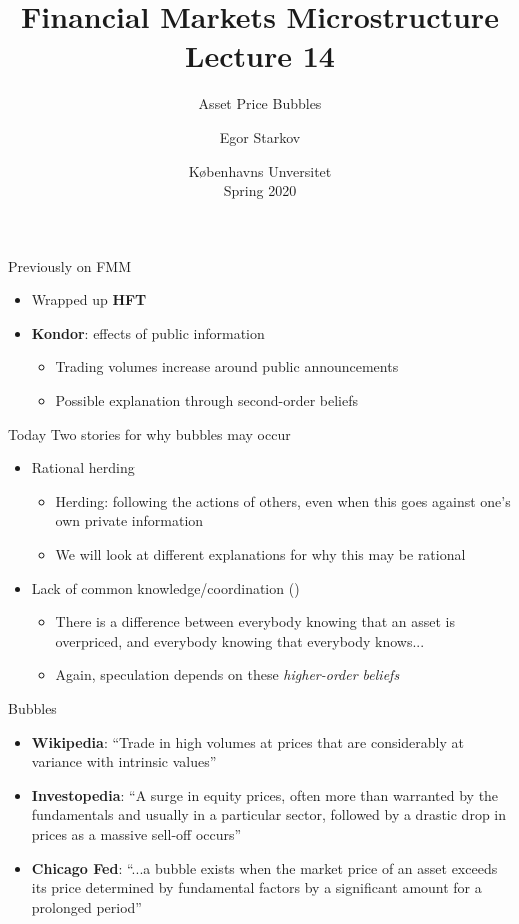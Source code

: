 \documentclass[english,10pt
,aspectratio=169
]{beamer}
\title{Financial Markets Microstructure \\ Lecture 14}
\subtitle{Asset Price Bubbles}
\author{Egor Starkov}
\date{K{\o}benhavns Unversitet \\
	Spring 2020}
\begin{document}
	\frame[plain]{\titlepage}



\begin{frame}{Previously on FMM}
	\begin{itemize}
		\item Wrapped up \textbf{HFT}
		\item \textbf{Kondor}: effects of public information
		\begin{itemize}
			\item Trading volumes increase around public announcements
			\item Possible explanation through second-order beliefs
		\end{itemize}
	\end{itemize}
\end{frame}	


\begin{frame}{Today}
	Two stories for why bubbles may occur
	\begin{itemize}
		\item Rational herding
		\begin{itemize}
			\item Herding: following the actions of others, even when this goes against one's own private information
			\item We will look at different explanations for why this may be rational
		\end{itemize}
		\item Lack of common knowledge/coordination (\cite{abreu_bubbles_2003})
		\begin{itemize}
			\item There is a difference between everybody knowing that an asset is overpriced, and everybody knowing that everybody knows...
			\item Again, speculation depends on these \emph{higher-order beliefs}
		\end{itemize}
	\end{itemize}
\end{frame}


\begin{frame}{Bubbles}
	\begin{itemize}
		\item \textbf{Wikipedia}: ``Trade in high volumes at prices that are considerably at variance with intrinsic values''
		\item \textbf{Investopedia}: ``A surge in equity prices, often more than warranted by the fundamentals and usually in a particular sector, followed by a drastic drop in prices as a massive sell-off occurs''
		\item \textbf{Chicago Fed}: ``...a bubble exists when the market price of an asset exceeds its price determined by fundamental factors by a significant amount for a prolonged period''
	\end{itemize}
\end{frame}
\end{document}
